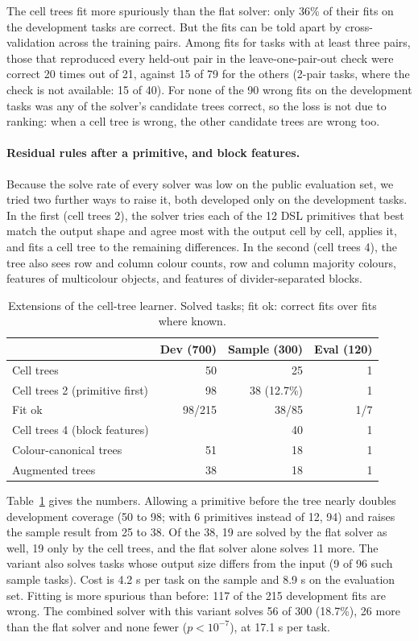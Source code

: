 \documentclass[sigconf,nonacm]{acmart}
\begin{document}
The cell trees fit more spuriously than the flat solver: only 36\% of their fits on the development tasks are correct. But the fits can be told apart by cross-validation across the training pairs. Among fits for tasks with at least three pairs, those that reproduced every held-out pair in the leave-one-pair-out check were correct 20 times out of 21, against 15 of 79 for the others (2-pair tasks, where the check is not available: 15 of 40). For none of the 90 wrong fits on the development tasks was any of the solver's candidate trees correct, so the loss is not due to ranking: when a cell tree is wrong, the other candidate trees are wrong too.

\paragraph{Residual rules after a primitive, and block features.} Because the solve rate of every solver was low on the public evaluation set, we tried two further ways to raise it, both developed only on the development tasks. In the first (cell trees 2), the solver tries each of the 12 DSL primitives that best match the output shape and agree most with the output cell by cell, applies it, and fits a cell tree to the remaining differences. In the second (cell trees 4), the tree also sees row and column colour counts, row and column majority colours, features of multicolour objects, and features of divider-separated blocks.

\begin{table}[!ht]
\caption{Extensions of the cell-tree learner. Solved tasks; fit ok: correct fits over fits where known.}
\label{tab:cell2}
\small
\begin{tabular}{@{}>{\raggedright\arraybackslash}p{3.1cm}rrr@{}}
\toprule
 & Dev (700) & Sample (300) & Eval (120) \\
\midrule
Cell trees & 50 & 25 & 1 \\
Cell trees 2 (primitive first) & 98 & 38 (12.7\%) & 1 \\
Fit ok & 98/215 & 38/85 & 1/7 \\
Cell trees 4 (block features) & & 40 & 1 \\
Colour-canonical trees & 51 & 18 & 1 \\
Augmented trees & 38 & 18 & 1 \\
\bottomrule
\end{tabular}
\end{table}

Table~\ref{tab:cell2} gives the numbers. Allowing a primitive before the tree nearly doubles development coverage (50 to 98; with 6 primitives instead of 12, 94) and raises the sample result from 25 to 38. Of the 38, 19 are solved by the flat solver as well, 19 only by the cell trees, and the flat solver alone solves 11 more. The variant also solves tasks whose output size differs from the input (9 of 96 such sample tasks). Cost is 4.2 s per task on the sample and 8.9 s on the evaluation set. Fitting is more spurious than before: 117 of the 215 development fits are wrong. The combined solver with this variant solves 56 of 300 (18.7\%), 26 more than the flat solver and none fewer ($p<10^{-7}$), at 17.1 s per task.
\end{document}
